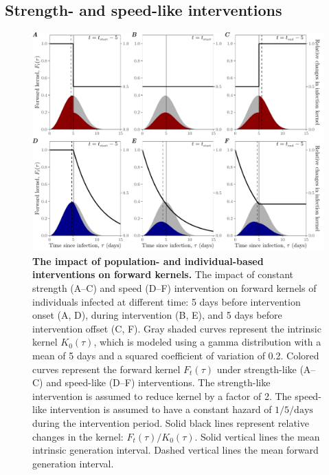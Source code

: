 \documentclass[12pt]{article}
\begin{document}
\subsection{Strength- and speed-like interventions}

\begin{figure}[!th]
\includegraphics[width=1\textwidth]{pop_ind_compare.pdf}
\caption{
\textbf{The impact of population- and individual-based interventions on forward kernels.}
The impact of constant strength (A--C) and speed (D--F) intervention on forward kernels of individuals infected at different time:
5 days before intervention onset (A, D), during intervention (B, E), and 5 days before intervention offset (C, F).
Gray shaded curves represent the intrinsic kernel $K_0(\tau)$, which is modeled using a gamma distribution with a mean of 5 days and a squared coefficient of variation of 0.2.
Colored curves represent the forward kernel $F_t(\tau)$ under strength-like (A--C) and speed-like (D--F) interventions.
The strength-like intervention is assumed to reduce kernel by a factor of 2.
The speed-like intervention is assumed to have a constant hazard of $1/5/\textrm{days}$ during the intervention period.
Solid black lines represent relative changes in the kernel: $F_t(\tau)/K_0(\tau)$.
Solid vertical lines the mean intrinsic generation interval.
Dashed vertical lines the mean forward generation interval.
}
\label{fig:indpop}
\end{figure}
\end{document}
